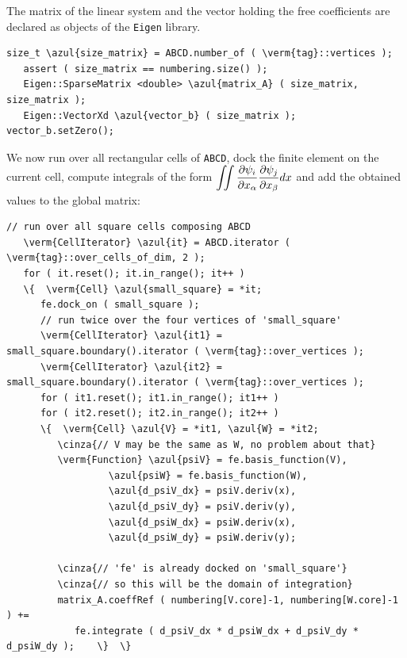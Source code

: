 The matrix of the linear system and the vector holding the free coefficients
are declared as objects of the {\small\tt Eigen} library.

\begin{Verbatim}[commandchars=\\\{\},formatcom=\small\tt,frame=single,
   label=parag-\ref{\numb section 6.\numb parag 2}.cpp,rulecolor=\color{coment},
   baselinestretch=0.94,framesep=2mm                                            ]
   size_t \azul{size_matrix} = ABCD.number_of ( \verm{tag}::vertices );
   assert ( size_matrix == numbering.size() );
   Eigen::SparseMatrix <double> \azul{matrix_A} ( size_matrix, size_matrix );
   Eigen::VectorXd \azul{vector_b} ( size_matrix );  vector_b.setZero();
\end{Verbatim}
\vskip 1mm

We now run over all rectangular cells of {\small\tt ABCD}, dock the finite element
on the current cell,
compute integrals of the form $ \displaystyle \int\!\!\!\int {\partial \psi_i \over
\partial x_\alpha} {\partial \psi_j \over \partial x_\beta} dx $ and add the obtained
values to the global matrix:
\vskip 1mm

\begin{Verbatim}[commandchars=\\\{\},formatcom=\small\tt,frame=single,
   label=parag-\ref{\numb section 6.\numb parag 2}.cpp,rulecolor=\color{coment},
   baselinestretch=0.94,framesep=2mm                                            ]
   // run over all square cells composing ABCD
   \verm{CellIterator} \azul{it} = ABCD.iterator ( \verm{tag}::over_cells_of_dim, 2 );
   for ( it.reset(); it.in_range(); it++ )
   \{  \verm{Cell} \azul{small_square} = *it;
      fe.dock_on ( small_square );
      // run twice over the four vertices of 'small_square'
      \verm{CellIterator} \azul{it1} = small_square.boundary().iterator ( \verm{tag}::over_vertices );
      \verm{CellIterator} \azul{it2} = small_square.boundary().iterator ( \verm{tag}::over_vertices );
      for ( it1.reset(); it1.in_range(); it1++ )
      for ( it2.reset(); it2.in_range(); it2++ )
      \{  \verm{Cell} \azul{V} = *it1, \azul{W} = *it2;
         \cinza{// V may be the same as W, no problem about that}
         \verm{Function} \azul{psiV} = fe.basis_function(V),
                  \azul{psiW} = fe.basis_function(W),
                  \azul{d_psiV_dx} = psiV.deriv(x),
                  \azul{d_psiV_dy} = psiV.deriv(y),
                  \azul{d_psiW_dx} = psiW.deriv(x),
                  \azul{d_psiW_dy} = psiW.deriv(y);
                  
         \cinza{// 'fe' is already docked on 'small_square'}
         \cinza{// so this will be the domain of integration}
         matrix_A.coeffRef ( numbering[V.core]-1, numbering[W.core]-1 ) +=
            fe.integrate ( d_psiV_dx * d_psiW_dx + d_psiV_dy * d_psiW_dy );    \}  \}
\end{Verbatim}

